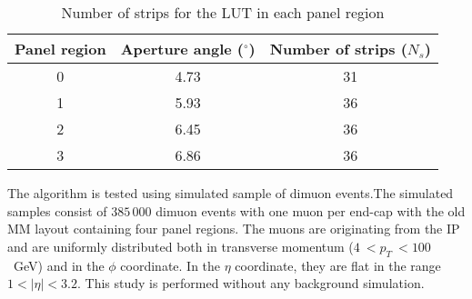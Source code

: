\begin{table}[h!tbp]
\centering
\begin{tabular}{ c  c  c }
\toprule
Panel region & Aperture angle ($^{\circ}$) & Number of strips ($N_{s}$) \\
\midrule
0 & 4.73 & 31\\
1 & 5.93 & 36\\
2 & 6.45 & 36\\
3 & 6.86 & 36\\
\bottomrule
\end{tabular}
\caption{Number of strips for the LUT in each panel region}
\label{tab:NsLUT}
\end{table}
%
%
The algorithm is tested using simulated sample of dimuon events.The simulated samples consist of $385\,000$ dimuon events with one muon per end-cap with the old MM layout containing four panel regions. The muons are originating from the IP and are uniformly distributed both in transverse momentum ($4~< p_{T}~<100$~GeV) and in the $\phi$ coordinate. In the $\eta$ coordinate, they are flat in the range $1<|\eta|<3.2$. This study is performed  without any background simulation.

